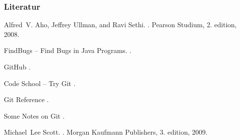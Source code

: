 \documentclass[ucs,9pt]{beamer}
\begin{document}
\begin{frame}
  \frametitle{Literatur}
    
  \begin{thebibliography}{10}
    
  \beamertemplatebookbibitems

  
    Alfred~V. Aho, Jeffrey Ullman, and Ravi Sethi.
    .
    \newblock Pearson Studium, 2. edition, 2008.

    {F}ind{B}ugs -- {F}ind {B}ugs in {J}ava {P}rograms.
    .
  
    {G}it{H}ub
    .

    {C}ode {S}chool -- {T}ry {G}it
    .

       {G}it {R}eference
    .

       {S}ome {N}otes on {G}it
    .

      Michael~Lee Scott.
      .
      \newblock Morgan Kaufmann Publishers, 3. edition, 2009.
    
  \end{thebibliography}
\end{frame}
\end{document}
